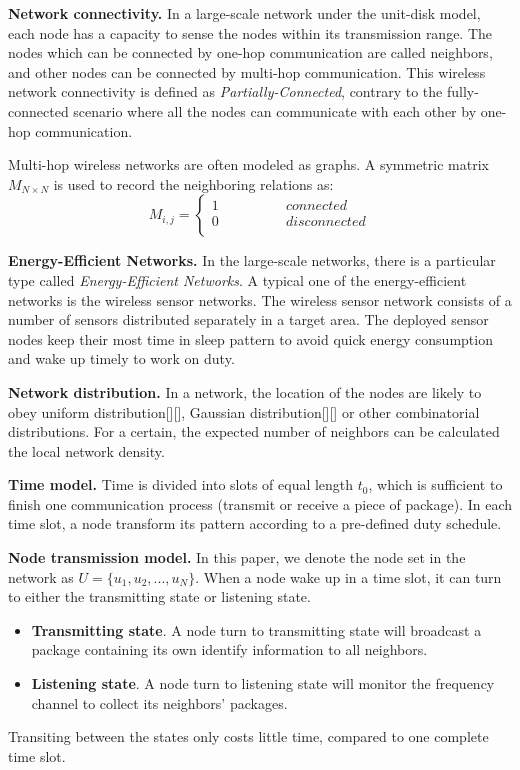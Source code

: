 \textbf{Network connectivity.} 
In a large-scale network under the unit-disk model, 
each node has a capacity to sense the nodes within its transmission range.
The nodes which can be connected by one-hop communication are called neighbors,
and other nodes can be connected by multi-hop communication.
This wireless network connectivity is defined as \emph{Partially-Connected},
contrary to the fully-connected scenario where all the nodes can communicate with 
each other by one-hop communication.

Multi-hop wireless networks are often modeled as graphs. 
A symmetric matrix $M_{N\times N}$ is used to record the neighboring relations as:
$$ M_{i,j}=\left\{
\begin{aligned}
1  & & & & & & {connected}\\
0  & & & & & & {disconnected}\\
\end{aligned}
\right.
$$

\textbf{Energy-Efficient Networks.} 
In the large-scale networks, 
there is a particular type called \emph{Energy-Efficient Networks}.
A typical one of the energy-efficient networks is the wireless sensor networks.
The wireless sensor network consists of a number of sensors distributed separately in a target area.
The deployed sensor nodes keep their most time in sleep pattern to avoid quick energy consumption 
and wake up timely to work on duty.

\textbf{Network distribution.} 
In a network, the location of the nodes are likely to obey uniform distribution[][],
Gaussian distribution[][] or other combinatorial distributions.
For a certain, the expected number of neighbors  can be calculated  the local network density. 

\textbf{Time model.} 
Time is divided into slots of equal length $t_0$, 
which is sufficient to finish  one communication process
(transmit or receive a piece of package). In each time slot, 
a node transform its pattern according to a pre-defined duty schedule.

\textbf{Node transmission model.} In this paper, we denote the node set in the network as $U = \{u_1,u_2,...,u_N\}$.
When a node wake up in a time slot, it can turn to either the transmitting state or listening state. 
\begin{itemize}
\item \textbf{Transmitting state}. A node turn to transmitting state will broadcast a package containing its own identify 
information to all neighbors.
\item  \textbf{Listening state}. A node turn to listening state will monitor the frequency channel to collect its neighbors' packages.
\end{itemize}
Transiting between the states only costs little time, compared to one complete time slot.

